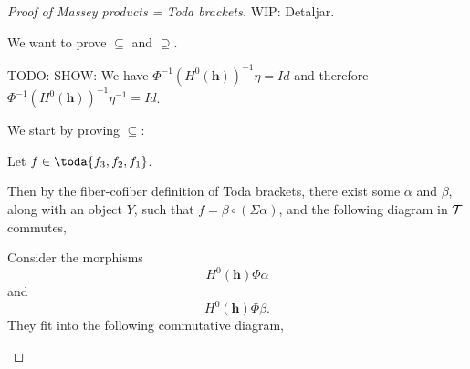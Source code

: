\begin{proof}[Proof of Massey products = Toda brackets]
    WIP: Detaljar.

    We want to prove \( \subseteq \) and \( \supseteq \).

    TODO: SHOW: We have \( \Phi^{-1} (H^0(\mathbf{h}))^{-1} \eta = Id \) and therefore \( \Phi^{-1} (H^0(\mathbf{h}))^{-1} \eta^{-1} = Id \).

    We start by proving \( \subseteq \):
    
    Let \( f \in \toda{f_3, f_2, f_1} \).

    Then by the fiber-cofiber definition of Toda brackets, there exist some \( \alpha \) and \( \beta \), along with an object \( Y \), such that \( f = \beta \circ (\Sigma \alpha) \), and the following diagram in \( {\mathcal{T}} \) commutes,
    \begin{center}
    \end{center}
    Consider the morphisms
    \[
        H^0(\mathbf{h}) \Phi \alpha
    \]
    and
    \[
        H^0(\mathbf{h}) \Phi \beta.
    \]
    They fit into the following commutative diagram,
    \begin{center}
\end{center}
\end{proof}
